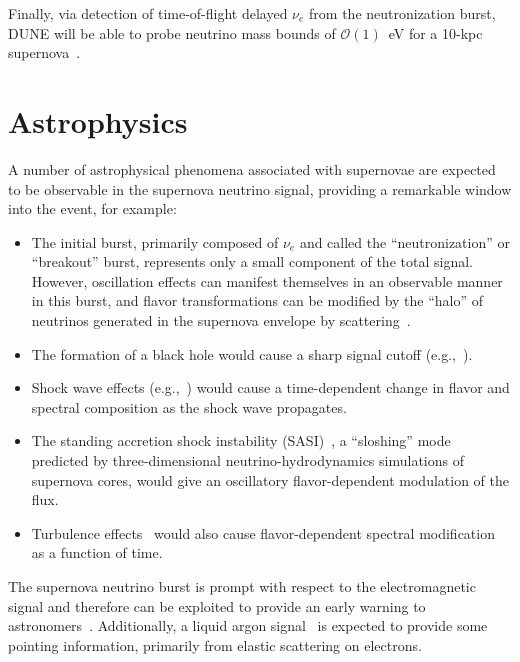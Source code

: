 Finally, via detection of time-of-flight delayed $\nu_e$ from the  neutronization burst,  DUNE will be able to probe neutrino mass bounds of $\mathcal{O}(1)$~eV for a 10-kpc supernova~\cite{Rossi-Torres:2015rla}. \\


\section{Astrophysics}
\label{sec:physics-snblowe-astrophysics}



A number of astrophysical phenomena associated with supernovae are expected to be observable
in the supernova neutrino signal, providing a remarkable window into the event, for example: 
\begin{itemize}
\item The initial burst, primarily composed of $\nu_e$ and called the
  ``neutronization'' or ``breakout''
  burst, %
  represents only a small component of the total signal.  However,
  oscillation effects can manifest themselves in an observable manner
  in this burst, and flavor transformations can be modified by the
  ``halo'' of neutrinos generated in the supernova envelope by
  scattering~\cite{Cherry:2013mv}.
\item The formation of a black hole would cause a sharp signal cutoff
  (e.g.,~\cite{Beacom:2000qy,Fischer:2008rh}).
\item Shock wave effects (e.g.,~\cite{Schirato:2002tg}) would cause a
  time-dependent change in flavor and spectral composition as the
  shock wave propagates.
\item The standing accretion shock instability
  (SASI)~\cite{Hanke:2011jf,Hanke:2013ena}, a ``sloshing'' mode
  predicted by three-dimensional neutrino-hydrodynamics simulations of
  supernova cores, would give an oscillatory flavor-dependent
  modulation of the flux.
\item Turbulence effects~\cite{Friedland:2006ta,Lund:2013uta} would
  also cause flavor-dependent spectral modification as a function of
  time.
\end{itemize}

The supernova neutrino burst is prompt with respect to the
electromagnetic signal and therefore can be exploited to provide an
early warning to astronomers~\cite{Antonioli:2004zb,Scholberg:2008fa}.
Additionally, a liquid argon signal~\cite{Bueno:2003ei} is expected to
provide some pointing information, primarily from elastic scattering
on electrons.

